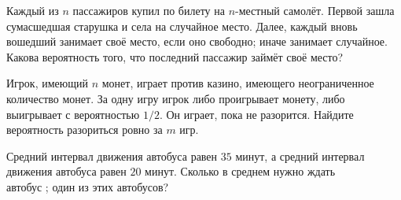 \documentclass[a4paper,12pt]{article}
\begin{document}
Каждый из $n$ пассажиров купил по билету на $n$-местный самолёт. Первой зашла сумасшедшая старушка и села на случайное место. Далее, каждый вновь вошедший занимает своё место, если оно свободно; иначе занимает случайное. Какова вероятность того, что последний пассажир займёт своё место?

Игрок, имеющий $n$ монет, играет против казино, имеющего неограниченное количество монет. За одну игру игрок либо проигрывает монету, либо выигрывает с вероятностью $1/2$. Он играет, пока не разорится. Найдите вероятность разориться ровно за $m$ игр.

Средний интервал движения автобуса  равен $35$ минут, а средний интервал движения автобуса  равен $20$ минут. Сколько в среднем нужно ждать\\ 
автобус ;
один из этих автобусов?

\end{document}
